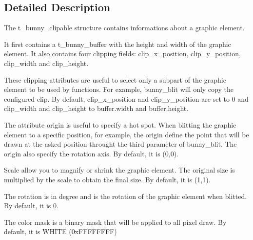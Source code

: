 \subsection{Detailed Description}
The t\-\_\-bunny\-\_\-clipable structure contains informations about a graphic element.

It first contains a t\-\_\-bunny\-\_\-buffer with the height and width of the graphic element. It also contains four clipping fields\-: clip\-\_\-x\-\_\-position, clip\-\_\-y\-\_\-position, clip\-\_\-width and clip\-\_\-height.

These clipping attributes are useful to select only a subpart of the graphic element to be used by functions. For example, bunny\-\_\-blit will only copy the configured clip. By default, clip\-\_\-x\-\_\-position and clip\-\_\-y\-\_\-position are set to 0 and clip\-\_\-width and clip\-\_\-height to buffer.\-width and buffer.\-height.

The attribute origin is useful to specify a hot spot. When blitting the graphic element to a specific position, for example, the origin define the point that will be drawn at the asked position throught the third parameter of bunny\-\_\-blit. The origin also specify the rotation axis. By default, it is (0,0).

Scale allow you to magnify or shrink the graphic element. The original size is multiplied by the scale to obtain the final size. By default, it is (1,1).

The rotation is in degree and is the rotation of the graphic element when blitted. By default, it is 0.

The color mask is a binary mask that will be applied to all pixel draw. By default, it is W\-H\-I\-T\-E (0x\-F\-F\-F\-F\-F\-F\-F\-F) 

